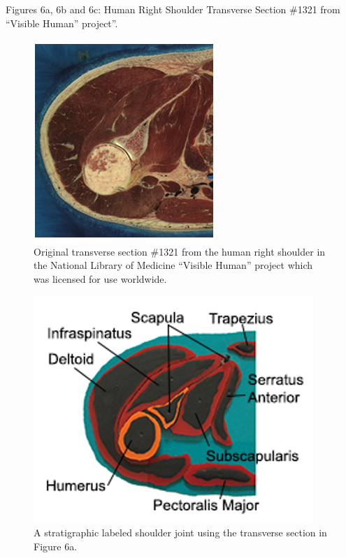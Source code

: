 \documentclass[11.5pt]{sig-alternate} %
\begin{document}
\begin{large}
Figures 6a, 6b and 6c: Human Right Shoulder Transverse Section \#1321 from “Visible Human” project”.
  
\begin{figure}[h] \ContinuedFloat*
    \centering
    \includegraphics[width= 0.5\linewidth]{fig 6a.png}
    \caption{Original transverse section \#1321 from the human right shoulder in the National Library of Medicine “Visible Human” project which was licensed for use worldwide.}
\end{figure}


\begin{figure}[h] \ContinuedFloat
    \centering
    \includegraphics[width=1\linewidth]{fig 6b.png}
    \caption{ A stratigraphic labeled shoulder joint using the transverse section in Figure 6a.}
\end{figure}


\end{large}
\end{document}
